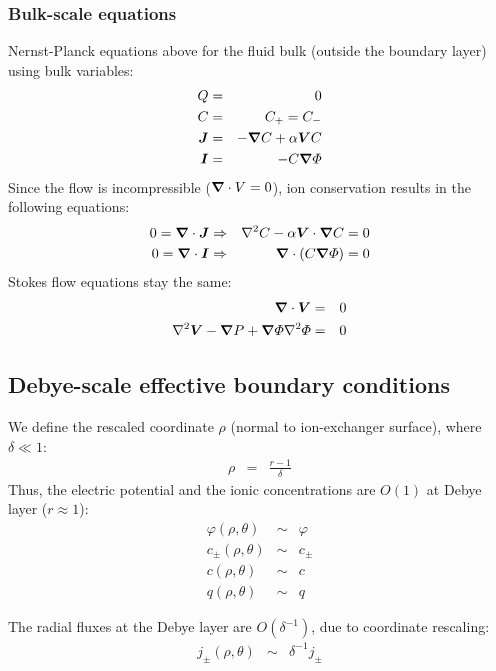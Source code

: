 \subsubsection  {Bulk-scale equations}
Nernst-Planck equations above for the fluid bulk (outside
the boundary layer) using bulk variables:
\begin{eqnarray}
Q & = & 0 \\
C & = & C_+ = C_- \\
\boldsymbol{J} &=& -\boldsymbol{\nabla} C + \alpha \boldsymbol{V} C \\
\boldsymbol{I} &=& -C \boldsymbol{\nabla} \varPhi
\end{eqnarray}
Since the flow is incompressible ($\boldsymbol{\nabla} \cdot V = 0$), 
ion conservation results in the following equations:
\begin{eqnarray}
0 = \boldsymbol{\nabla} \cdot \boldsymbol{J} &\Rightarrow& \nabla^2 C - \alpha \boldsymbol{V} \cdot \boldsymbol{\nabla} C = 0 \\
0 = \boldsymbol{\nabla} \cdot \boldsymbol{I} &\Rightarrow& \boldsymbol{\nabla} \cdot \left( C \boldsymbol{\nabla} \varPhi \right) = 0
\end{eqnarray}
Stokes flow equations stay the same:
\begin{eqnarray}
\boldsymbol{\nabla} \cdot \boldsymbol{V} &=& 0 \\
\nabla^2 \boldsymbol{V} - \boldsymbol{\nabla} P + \boldsymbol{\nabla} \varPhi \nabla^2 \varPhi &=& 0
\end{eqnarray}

\subsection{Debye-scale effective boundary conditions}
We define the rescaled coordinate $\rho$ (normal to ion-exchanger surface), where $\delta \ll 1$:
\begin{eqnarray}
 \nonumber \rho &=& \frac{r-1}{\delta} 
\end{eqnarray}
Thus, the electric potential and the ionic concentrations are $O(1)$ at Debye layer ($r \approx 1$):
\begin{eqnarray}
 \nonumber \varphi(\rho,\theta) &\sim& \varphi \\
 \nonumber c_\pm(\rho,\theta) &\sim& c_\pm \\
 \nonumber c(\rho,\theta) &\sim& c \\
 \nonumber q(\rho,\theta) &\sim& q
\end{eqnarray}

The radial fluxes at the Debye layer are $O(\delta^{-1})$, due to coordinate rescaling:
\begin{eqnarray}
 \nonumber j_\pm(\rho, \theta) &\sim& \delta^{-1} j_\pm
\end{eqnarray}


